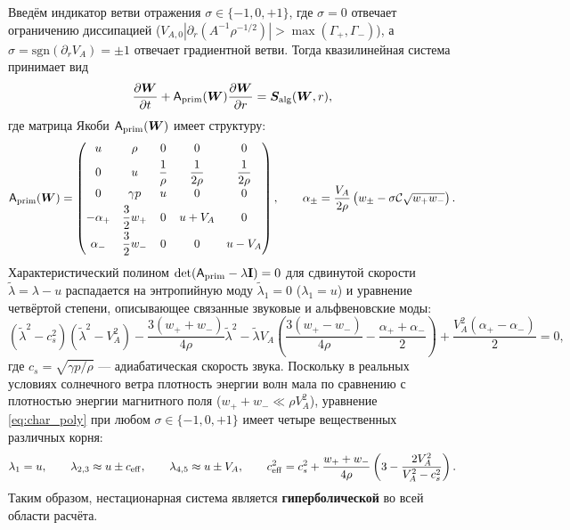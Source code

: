 \documentclass[11pt,a4paper]{article}
\begin{document}
Введём индикатор ветви отражения $\sigma \in \{-1, 0, +1\}$, где $\sigma = 0$ отвечает ограничению диссипацией ($V_{A,0}|\partial_r(A^{-1}\rho^{-1/2})| > \max(\Gamma_+,\Gamma_-)$), а $\sigma = \mathrm{sgn}(\partial_r V_A) = \pm 1$ отвечает градиентной ветви. Тогда квазилинейная система принимает вид
\begin{equation}
\frac{\partial\bm{W}}{\partial t} + \mathsf{A}_{\rm prim}(\bm{W})\frac{\partial\bm{W}}{\partial r} = \bm{S}_{\rm alg}(\bm{W}, r),
\label{eq:quasilinear_form}
\end{equation}
где матрица Якоби $\mathsf{A}_{\rm prim}(\bm{W})$ имеет структуру:
\begin{equation}
\mathsf{A}_{\rm prim}(\bm{W}) =
\begin{pmatrix}
u & \rho & 0 & 0 & 0 \\[4pt]
0 & u & \dfrac{1}{\rho} & \dfrac{1}{2\rho} & \dfrac{1}{2\rho} \\[6pt]
0 & \gamma p & u & 0 & 0 \\[4pt]
-\alpha_+ & \dfrac{3}{2}w_+ & 0 & u + V_A & 0 \\[6pt]
\alpha_- & \dfrac{3}{2}w_- & 0 & 0 & u - V_A
\end{pmatrix}, \qquad
\alpha_\pm = \frac{V_A}{2\rho}\left(w_\pm - \sigma\mathcal{C}\sqrt{w_+ w_-}\right).
\label{eq:A_prim}
\end{equation}
Характеристический полином $\det(\mathsf{A}_{\rm prim} - \lambda\mathbf{I}) = 0$ для сдвинутой скорости $\tilde{\lambda} = \lambda - u$ распадается на энтропийную моду $\tilde{\lambda}_1 = 0$ ($\lambda_1 = u$) и уравнение четвёртой степени, описывающее связанные звуковые и альфвеновские моды:
\begin{equation}
\left(\tilde{\lambda}^2 - c_s^2\right)\left(\tilde{\lambda}^2 - V_A^2\right) - \frac{3(w_+ + w_-)}{4\rho}\tilde{\lambda}^2 - \tilde{\lambda}V_A\left(\frac{3(w_+ - w_-)}{4\rho} - \frac{\alpha_+ + \alpha_-}{2}\right) + \frac{V_A^2(\alpha_+ - \alpha_-)}{2} = 0,
\label{eq:char_poly}
\end{equation}
где $c_s = \sqrt{\gamma p/\rho}$ --- адиабатическая скорость звука. Поскольку в реальных условиях солнечного ветра плотность энергии волн мала по сравнению с плотностью энергии магнитного поля ($w_+ + w_- \ll \rho V_A^2$), уравнение \eqref{eq:char_poly} при любом $\sigma \in \{-1,0,+1\}$ имеет четыре вещественных различных корня:
\begin{equation}
\lambda_1 = u, \qquad \lambda_{2,3} \approx u \pm c_{\rm eff}, \qquad \lambda_{4,5} \approx u \pm V_A, \qquad c_{\rm eff}^2 = c_s^2 + \frac{w_+ + w_-}{4\rho}\left(3 - \frac{2 V_A^2}{V_A^2 - c_s^2}\right).
\label{eq:eigenvalues_approx}
\end{equation}
Таким образом, нестационарная система является \textbf{гиперболической} во всей области расчёта.
\end{document}

